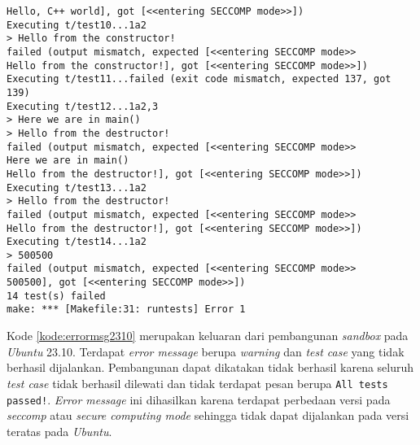 \begin{lstlisting}[caption=\textit{Error message} pembangunan \textit{sandbox} pada \textit{Ubuntu} 23.10, label=kode:errormsg2310]
Hello, C++ world], got [<<entering SECCOMP mode>>])
Executing t/test10...1a2
> Hello from the constructor!
failed (output mismatch, expected [<<entering SECCOMP mode>>
Hello from the constructor!], got [<<entering SECCOMP mode>>])
Executing t/test11...failed (exit code mismatch, expected 137, got 139)
Executing t/test12...1a2,3
> Here we are in main()
> Hello from the destructor!
failed (output mismatch, expected [<<entering SECCOMP mode>>
Here we are in main()
Hello from the destructor!], got [<<entering SECCOMP mode>>])
Executing t/test13...1a2
> Hello from the destructor!
failed (output mismatch, expected [<<entering SECCOMP mode>>
Hello from the destructor!], got [<<entering SECCOMP mode>>])
Executing t/test14...1a2
> 500500
failed (output mismatch, expected [<<entering SECCOMP mode>>
500500], got [<<entering SECCOMP mode>>])
14 test(s) failed
make: *** [Makefile:31: runtests] Error 1
\end{lstlisting}
Kode \ref{kode:errormsg2310} merupakan keluaran dari pembangunan \textit{sandbox} pada \textit{Ubuntu} 23.10. Terdapat \textit{error message} berupa \textit{warning} dan \textit{test case} yang tidak berhasil dijalankan. Pembangunan dapat dikatakan tidak berhasil karena seluruh \textit{test case} tidak berhasil dilewati dan tidak terdapat pesan berupa \texttt{All tests passed!}. \textit{Error message} ini dihasilkan karena terdapat perbedaan versi pada \textit{seccomp} atau \textit{secure computing mode} sehingga tidak dapat dijalankan pada versi teratas pada \textit{Ubuntu}.